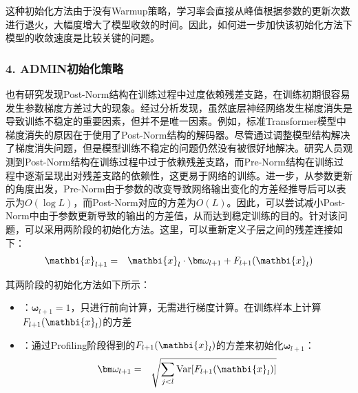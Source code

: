 \parinterval 这种初始化方法由于没有Warmup策略，学习率会直接从峰值根据参数的更新次数进行退火，大幅度增大了模型收敛的时间。因此，如何进一步加快该初始化方法下模型的收敛速度是比较关键的问题。


\subsubsection{4. ADMIN初始化策略}

\parinterval 也有研究发现Post-Norm结构在训练过程中过度依赖残差支路，在训练初期很容易发生参数梯度方差过大的现象。经过分析发现，虽然底层神经网络发生梯度消失是导致训练不稳定的重要因素，但并不是唯一因素。例如，标准Transformer模型中梯度消失的原因在于使用了Post-Norm结构的解码器。尽管通过调整模型结构解决了梯度消失问题，但是模型训练不稳定的问题仍然没有被很好地解决。研究人员观测到Post-Norm结构在训练过程中过于依赖残差支路，而Pre-Norm结构在训练过程中逐渐呈现出对残差支路的依赖性，这更易于网络的训练。进一步，从参数更新的角度出发，Pre-Norm由于参数的改变导致网络输出变化的方差经推导后可以表示为$O(\log L)$，而Post-Norm对应的方差为$O(L)$。因此，可以尝试减小Post-Norm中由于参数更新导致的输出的方差值，从而达到稳定训练的目的。针对该问题，可以采用两阶段的初始化方法。这里，可以重新定义子层之间的残差连接如下：
\begin{eqnarray}
\mathbi{x}_{l+1} &=& \mathbi{x}_l \cdot {\bm  \omega_{l+1}} + F_{l+1}(\mathbi{x}_l)
\label{eq:15-47}
\end{eqnarray}

\noindent 其两阶段的初始化方法如下所示：

\begin{itemize}
\vspace{0.5em}
\item {\small{}}：${\bm  \omega_{l+1}} = 1$，只进行前向计算，无需进行梯度计算。在训练样本上计算$F_{l+1}(\mathbi{x}_l)$的方差
\vspace{0.5em}
\item {\small{}}：通过Profiling阶段得到的$F_{l+1}(\mathbi{x}_l)$的方差来初始化$\bm  \omega_{l+1}$：
\begin{eqnarray}
{\bm \omega_{l+1}} &=& \sqrt{\sum_{j<l}\textrm{Var}[F_{l+1}(\mathbi{x}_l)]}
\label{eq:15-48}
\end{eqnarray}
\end{itemize}

